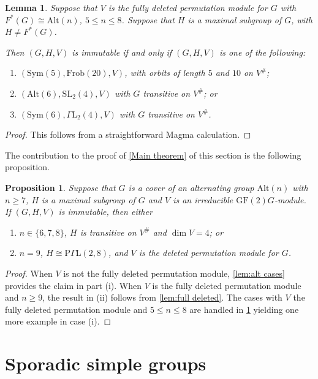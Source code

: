 \documentclass[12pt]{amsart}
\newtheorem{proposition}[theorem]{Proposition}
\newtheorem{lemma}[theorem]{Lemma}
\theoremstyle{remark}
\theoremstyle{notation}
\theoremstyle{definition}
\newcommand{\GF}{\mathrm{GF}}
\newcommand{\SL}{\mathrm{SL}}
\newcommand{\0}{\emptyset}
\newcommand{\Sym}{\mathrm{Sym}}
\newcommand{\Alt}{\mathrm{Alt}}
\begin{document}
\begin{lemma}\label{small:alt}
Suppose that $V$ is the fully deleted permutation module for $G$ with $F^*(G) \cong \Alt(n)$, $5\le n \le 8$. Suppose that $H$ is a maximal subgroup of $G$, with $H \ne F^*(G)$.

Then $(G,H,V)$ is immutable if and only if $(G,H,V)$ is one of the following:
\begin{enumerate} \item $(\Sym(5),\mathrm{Frob}(20),V)$, with orbits of length $5$ and $10$ on $V^\#$; \item $(\Alt(6),\SL_2(4),V)$ with $G$ transitive on $V^\#$;
 or \item $(\Sym(6),\Gamma\mathrm L_2(4),V)$ with $G$ transitive on $V^\#$.
\end{enumerate}
\end{lemma}

\begin{proof} This follows from a straightforward  {\sc Magma} calculation.\end{proof}

The contribution to the proof of \cref{Main theorem} of this section is the following proposition.


\begin{proposition}\label{prop:altgrps}
Suppose that $ G $ is a cover of an alternating group $\Alt(n) $ with $n \ge 7$, $H$ is a maximal subgroup of $G$ and $V$ is an irreducible $\GF(2)G$-module. If $(G,H,V)$ is   immutable,  then either
\begin{enumerate}\item
$n\in \{6,7,8\}$,  $H$ is transitive on $V^\#$ and $\dim V=4$; or
 \item
  $n=9$, $H \cong \mathrm P\Gamma\mathrm L(2,8)$, and $V$ is the deleted permutation module for $G$.
\end{enumerate}
\end{proposition}

\begin{proof} When $V$ is not the fully deleted permutation module, \cref{lem:alt cases} provides the claim in part (i). When $V$ is  the fully deleted permutation module and $n \ge 9$, the result  in (ii) follows from
\cref{lem:full deleted}.  The cases with $V$    the fully deleted permutation module and $5 \le n \le 8$ are handled in \cref{small:alt} yielding one more example in case (i).
\end{proof}


\section{Sporadic simple groups}\label{sec:sporadics}
\end{document}
